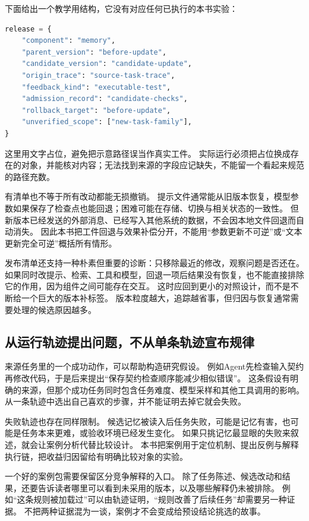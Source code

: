 \par\noindent\begin{minipage}{\linewidth}
下面给出一个教学用结构，它没有对应任何已执行的本书实验：
\begin{lstlisting}[language=Python]
release = {
    "component": "memory",
    "parent_version": "before-update",
    "candidate_version": "candidate-update",
    "origin_trace": "source-task-trace",
    "feedback_kind": "executable-test",
    "admission_record": "candidate-checks",
    "rollback_target": "before-update",
    "unverified_scope": ["new-task-family"],
}
\end{lstlisting}
\end{minipage}\par
这里用文字占位，避免把示意路径误当作真实工件。
实际运行必须把占位换成存在的对象，并能核对内容；无法找到来源的字段应记缺失，不能留一个看起来规范的路径充数。

有清单也不等于所有改动都能无损撤销。
提示文件通常能从旧版本恢复，模型参数如果保存了检查点也能回退；困难可能在存储、切换与相关状态的一致性。
但新版本已经发送的外部消息、已经写入其他系统的数据，不会因本地文件回退而自动消失。
因此本书把工件回退与效果补偿分开，不能用``参数更新不可逆''或``文本更新完全可逆''概括所有情形。

发布清单还支持一种朴素但重要的诊断：只移除最近的修改，观察问题是否还在。
如果同时改提示、检索、工具和模型，回退一项后结果没有恢复，也不能直接排除它的作用，因为组件之间可能存在交互。
这时应回到更小的对照设计，而不是不断给一个巨大的版本补标签。
版本粒度越大，追踪越省事，但归因与恢复通常需要处理的候选原因越多。

\subsection{从运行轨迹提出问题，不从单条轨迹宣布规律}

来源任务里的一个成功动作，可以帮助构造研究假设。
例如Agent先检查输入契约再修改代码，于是后来提出``保存契约检查顺序能减少相似错误''。
这条假设有明确的来源，但那个成功任务同时包含任务难度、模型采样和其他工具调用的影响。
从一条轨迹中选出自己喜欢的步骤，并不能证明去掉它就会失败。

失败轨迹也存在同样限制。
候选记忆被读入后任务失败，可能是记忆有害，也可能是任务本来更难，或验收环境已经发生变化。
如果只挑记忆最显眼的失败来叙述，就会让案例分析代替比较设计。
本书把案例用于定位机制、提出反例与解释执行链，把收益归因留给有明确比较对象的实验。

一个好的案例包需要保留区分竞争解释的入口。
除了任务陈述、候选改动和结果，还要告诉读者哪里可以看到未采用的版本，以及哪些解释仍未被排除。
例如``这条规则被加载过''可以由轨迹证明，``规则改善了后续任务''却需要另一种证据。
不把两种证据混为一谈，案例才不会变成给预设结论挑选的故事。

